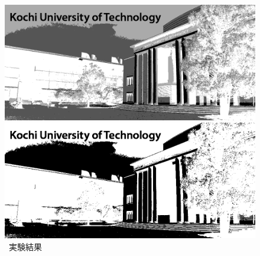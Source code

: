 \begin{figure}[H]
\begin{minipage}[b]{.23\textwidth}
    \end{minipage}
    \begin{minipage}[b]{.23\textwidth}
        \centering
        \includegraphics[keepaspectratio,width=\textwidth]{../../Figures/05_33_2.png}
    \end{minipage}
    \begin{minipage}[b]{.23\textwidth}
        \centering
        \includegraphics[keepaspectratio,width=\textwidth]{../../Figures/05_34_1.png}
    \end{minipage}
    \caption{\kadaiac\ 実験結果}
\end{figure}
